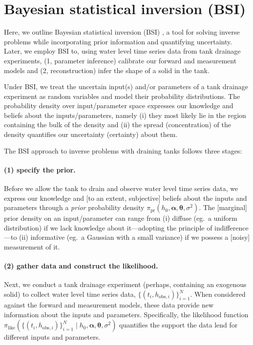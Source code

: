 \documentclass[openacc]{rsproca_new}%
\newcommand\thedata {$\{(t_i,h_{\text{obs}, i})\}_{i=1}^{N}$\xspace}
\newcommand\thedatanomath {\{(t_i,h_{\text{obs}, i})\}_{i=1}^{N}}
\begin{document}
\section{Bayesian statistical inversion (BSI)} \label{sec:bsi}
Here, we outline Bayesian statistical inversion (BSI)  \cite{calvetti2018inverse,waqar2023tutorial,kaipio2006statistical,dashti2013bayesian,allmaras2013estimating}, a tool for solving inverse problems while incorporating prior information and quantifying uncertainty. 
Later, we employ BSI to, using water level time series data from tank drainage experiments,  
(1, parameter inference) calibrate our forward and measurement models and 
(2, reconstruction) infer the shape of a solid in the tank.

Under BSI, we treat the uncertain input(s) and/or parameters of a tank drainage experiment as random variables and model their probability distributions.
The probability density over input/parameter space expresses our knowledge and beliefs about the inputs/parameters, namely 
(i) they most likely lie in the region containing the bulk of the density and (ii) the spread (concentration) of the density quantifies our uncertainty (certainty) about them. 


The BSI approach to inverse problems with draining tanks follows three stages:

\vspace{-\baselineskip}
\paragraph{(1) specify the prior.}
Before we allow the tank to drain and observe water level time series data, we express our knowledge and [to an extent, subjective] beliefs about the inputs and parameters through a \emph{prior} probability density $\pi_{\text{pr}}(h_0, \boldsymbol \alpha, \boldsymbol \theta, \sigma^2)$.
The [marginal] prior density on an input/parameter can range from 
(i) diffuse (eg.\ a uniform distribution) if we lack knowledge about it---adopting the principle of indifference---to 
(ii) informative (eg.\ a Gaussian with a small variance) if we possess a [noisy] measurement of it. 
\cite{van2021bayesian}

\vspace{-\baselineskip}
\paragraph{(2) gather data and construct the likelihood.}
Next, we conduct a tank drainage experiment (perhaps, containing an exogenous solid) to collect water level time series data, \thedata. 
When considered against the forward and measurement models, these data provide new information about the inputs and parameters. Specifically, the likelihood function $\pi_{\text{like}}(\thedatanomath \mid h_0,\boldsymbol  \alpha, \boldsymbol \theta, \sigma^2 )$ quantifies the support the data lend for different inputs and parameters.
\end{document}
